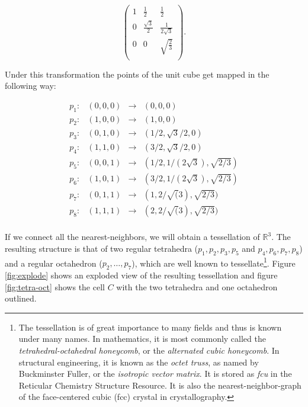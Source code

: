\documentclass[12pt,a4paper]{article}
\newcommand{\R}{{\mathbb R^3}}
\theoremstyle{definition}
\theoremstyle{remark}
\theoremstyle{theorem}
\begin{document}
$$
\begin{pmatrix}
1 & \frac 12 & \frac 12 \\
0 & \frac {\sqrt{3}}2 & \frac 1{2\sqrt{3}}  \\
0 & 0 & \sqrt{\frac 23} \\
\end{pmatrix}.
$$

Under this transformation the points of the unit cube get mapped in the following way:

$$\begin{matrix}
	p_1: & (0,0,0) & \rightarrow & (0,0,0) \\
	p_2: & (1,0,0) & \rightarrow & (1,0,0)\\
	p_3: & (0,1,0) & \rightarrow & (1/2,\sqrt{3}/2,0)\\
	p_4: & (1,1,0) & \rightarrow & (3/2,\sqrt{3}/2,0)\\

	p_5: & (0,0,1) & \rightarrow & (1/2,1/(2\sqrt{3}),\sqrt{2/3})\\
	p_6: & (1,0,1) & \rightarrow & (3/2,1/(2\sqrt{3}),\sqrt{2/3})\\
	p_7: & (0,1,1) & \rightarrow & (1,2/\sqrt(3), \sqrt{2/3})\\
	p_8: & (1,1,1) & \rightarrow & (2,2/\sqrt(3), \sqrt{2/3})\\
\end{matrix}$$

If we connect all the nearest-neighbors, we will obtain a tessellation of $\R$. The resulting structure is that of two regular tetrahedra ($p_1,p_2,p_3,p_5$ and $p_4,p_6,p_7,p_8$) and a regular octahedron ($p_2,\dots ,p_7$), which are well known to tessellate\footnote{ The tessellation is of great importance to many fields and thus is known under many names. In mathematics, it is most commonly called the \textit{tetrahedral-octahedral honeycomb}, or the \textit{alternated cubic honeycomb}. In structural engineering, it is known as the \textit{octet truss}, as named by Buckminster Fuller, or the \textit{isotropic vector matrix}. It is stored as \textit{fcu} in the Reticular Chemistry Structure Resource\cite{RCSR}. It is also the nearest-neighbor-graph of the face-centered cubic (fcc) crystal in crystallography\cite{Gabbrielli12}.  }. Figure \ref{fig:explode} shows an exploded view of the resulting tessellation and figure \ref{fig:tetra-oct} shows the cell $C$ with the two tetrahedra and one octahedron outlined. 
\end{document}
